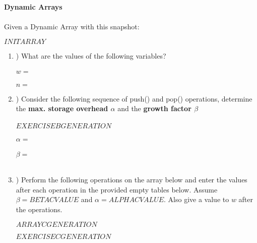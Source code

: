 \documentclass[12pt]{article}
\begin{document}
    \textbf{\LARGE{Dynamic Arrays}}\\
    \\
    \noindent
    Given a Dynamic Array with this snapshot:\\
    \begin{center}
        $INITARRAY$
    \end{center}
    \begin{enumerate}[label=\alph*]
        \item \hspace{-5px}) What are the values of the following variables?\\
        \\
        $w = $\\
        \\
        $n = $
        \\
        \item \hspace{-5px}) Consider the following sequence of push() and pop() operations, determine the \textbf{max. storage overhead $\alpha$}
        and the \textbf{growth factor $\beta$}\\
        \\
        $EXERCISEBGENERATION$\\
        \\
        $\alpha = $\\
        \\
        $\beta = $\\
        \\
        \item \hspace{-5px}) Perform the following operations on the array below and enter the values after each operation in the provided empty
        tables below. Assume $\beta = BETACVALUE$ and $\alpha = ALPHACVALUE$. Also give a value to $w$ after the operations.\\
        \begin{center}
            $ARRAYCGENERATION$
        \end{center}
        $EXERCISECGENERATION$
    \end{enumerate}
\end{document}
